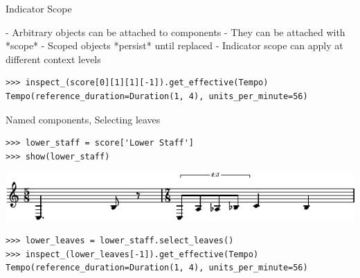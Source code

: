 \begin{frame}[fragile]{Indicator Scope}
\begin{markdown}
- Arbitrary objects can be attached to components
- They can be attached with *scope*
- Scoped objects *persist* until replaced
- Indicator scope can apply at different context levels
\end{markdown}

\begin{abjadbookoutput}
\begin{singlespacing}
\vspace{-0.5\baselineskip}
\begin{verbatim}
>>> inspect_(score[0][1][1][-1]).get_effective(Tempo)
Tempo(reference_duration=Duration(1, 4), units_per_minute=56)
\end{verbatim}
\end{singlespacing}
\end{abjadbookoutput}

\end{frame}

\begin{frame}[fragile]{Named components, Selecting leaves}

\begin{abjadbookoutput}
\begin{singlespacing}
\vspace{-0.5\baselineskip}
\begin{verbatim}
>>> lower_staff = score['Lower Staff']
>>> show(lower_staff)
\end{verbatim}
\noindent\includegraphics[max width=\textwidth,]{assets/lilypond-186cde23c908e6e806ba5e607f61aec2.pdf}
\begin{verbatim}
>>> lower_leaves = lower_staff.select_leaves()
>>> inspect_(lower_leaves[-1]).get_effective(Tempo)
Tempo(reference_duration=Duration(1, 4), units_per_minute=56)
\end{verbatim}
\end{singlespacing}
\end{abjadbookoutput}

\end{frame}

